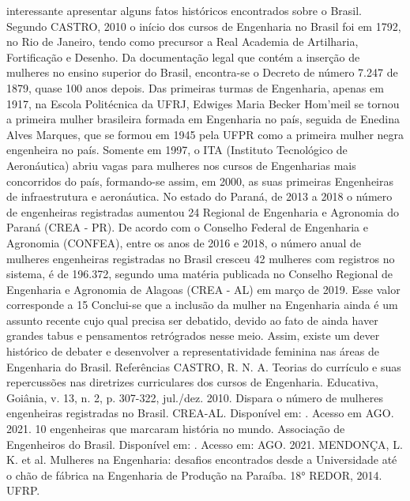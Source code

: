 interessante apresentar alguns fatos históricos encontrados sobre o Brasil. Segundo CASTRO,
2010 o início dos cursos de Engenharia no Brasil foi em 1792, no Rio de Janeiro, tendo como
precursor a Real Academia de Artilharia, Fortificação e Desenho. Da documentação legal que
contém a inserção de mulheres no ensino superior do Brasil, encontra-se o Decreto de número
7.247 de 1879, quase 100 anos depois.
Das primeiras turmas de Engenharia, apenas em 1917, na Escola Politécnica da UFRJ,
Edwiges Maria Becker Hom’meil se tornou a primeira mulher brasileira formada em Engenharia
no país, seguida de Enedina Alves Marques, que se formou em 1945 pela UFPR como a primeira
mulher negra engenheira no país. Somente em 1997, o ITA (Instituto Tecnológico de
Aeronáutica) abriu vagas para mulheres nos cursos de Engenharias mais concorridos do país,
formando-se assim, em 2000, as suas primeiras Engenheiras de infraestrutura e aeronáutica.
No estado do Paraná, de 2013 a 2018 o número de engenheiras registradas aumentou
24%
Regional de Engenharia e Agronomia do Paraná (CREA - PR). De acordo com o Conselho
Federal de Engenharia e Agronomia (CONFEA), entre os anos de 2016 e 2018, o número anual
de mulheres engenheiras registradas no Brasil cresceu 42%
mulheres com registros no sistema, é de 196.372, segundo uma matéria publicada no Conselho
Regional de Engenharia e Agronomia de Alagoas (CREA - AL) em março de 2019. Esse valor
corresponde a 15%
Conclui-se que a inclusão da mulher na Engenharia ainda é um assunto recente cujo qual
precisa ser debatido, devido ao fato de ainda haver grandes tabus e pensamentos retrógrados
nesse meio. Assim, existe um dever histórico de debater e desenvolver a representatividade
feminina nas áreas de Engenharia do Brasil.
Referências
CASTRO, R. N. A. Teorias do currículo e suas repercussões nas diretrizes curriculares dos
cursos de Engenharia. Educativa, Goiânia, v. 13, n. 2, p. 307-322, jul./dez. 2010.
Dispara o número de mulheres engenheiras registradas no Brasil. CREA-AL. Disponível em:
.
Acesso em AGO. 2021.
10 engenheiras que marcaram história no mundo. Associação de Engenheiros do Brasil.
Disponível em:
. Acesso em:
AGO. 2021.
MENDONÇA, L. K. et al. Mulheres na Engenharia: desafios encontrados desde a
Universidade até o chão de fábrica na Engenharia de Produção na Paraíba. 18° REDOR,
2014. UFRP.



